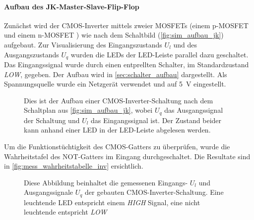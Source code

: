 \documentclass[12pt,english,ngerman]{scrartcl}
\begin{document}
\paragraph{Aufbau des JK-Master-Slave-Flip-Flop}\label{sec:mess_cmos}
Zunächst wird der CMOS-Inverter mittels zweier MOSFETs (einem p-MOSFET \cite{ZVP2106A} und
einem n-MOSFET \cite{ZVN2106A}) wie nach dem Schaltbild (\autoref{fig:sim_aufbau_jk})
aufgebaut. Zur Visualisierung des Eingangszustands $U_l$ und des
Ausgangszustands $U_q$ wurden die LEDs der LED-Leiste parallel dazu geschaltet. Das
Eingangssignal wurde durch einen entprellten Schalter, im Standardzustand
\textit{LOW}, gegeben. Der Aufbau wird in \autoref{sec:schalter_aufbau} dargestellt. Als
Spannungsquelle wurde ein Netzgerät verwendet und auf \SI{5}{\volt}
eingestellt. 

\begin{figure}[H]
  \centering
  \caption{Dies ist der Aufbau einer CMOS-Inverter-Schaltung nach dem
  Schaltplan aus \autoref{fig:sim_aufbau_jk}, wobei $U_q$ das Ausgangssignal
  der Schaltung und $U_l$ das Eingangssignal ist. Der Zustand
  beider kann anhand einer LED in der LED-Leiste abgelesen werden.}
  \label{fig:mess_aufbau_inv}
\end{figure}


Um die Funktionstüchtigkeit des CMOS-Gatters zu überprüfen, wurde die
Wahrheitstafel des NOT-Gatters im Eingang durchgeschaltet. Die Resultate
sind in \autoref{fig:mess_wahrheitstabelle_inv} ersichtlich.

\begin{figure}[H]
  \centering
  \caption{Diese Abbildung beinhaltet die gemessenen Eingangs- $U_l$ und
  Ausgangssignale $U_q$ der gebauten CMOS-Inverter-Schaltung. Eine leuchtende
  LED entspricht einem \textit{HIGH} Signal, eine nicht leuchtende entspricht
  \textit{LOW}} 
\label{fig:mess_wahrheitstabelle_inv}
\end{figure}


\end{document}
